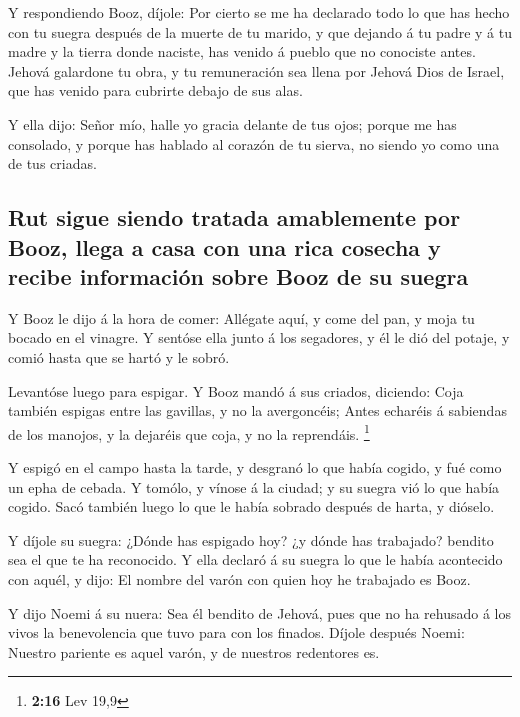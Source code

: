  Y respondiendo Booz, díjole: Por cierto se me ha declarado
todo lo que has hecho con tu suegra después de la muerte de tu marido, y
que dejando á tu padre y á tu madre y la tierra donde naciste, has
venido á pueblo que no conociste antes.  Jehová galardone
tu obra, y tu remuneración sea llena por Jehová Dios de Israel, que has
venido para cubrirte debajo de sus alas.

 Y ella dijo: Señor mío, halle yo gracia delante de tus
ojos; porque me has consolado, y porque has hablado al corazón de tu
sierva, no siendo yo como una de tus criadas.

\hypertarget{rut-sigue-siendo-tratada-amablemente-por-booz-llega-a-casa-con-una-rica-cosecha-y-recibe-informaciuxf3n-sobre-booz-de-su-suegra}{%
\subsection{Rut sigue siendo tratada amablemente por Booz, llega a casa
con una rica cosecha y recibe información sobre Booz de su
suegra}\label{rut-sigue-siendo-tratada-amablemente-por-booz-llega-a-casa-con-una-rica-cosecha-y-recibe-informaciuxf3n-sobre-booz-de-su-suegra}}

 Y Booz le dijo á la hora de comer: Allégate aquí, y come
del pan, y moja tu bocado en el vinagre. Y sentóse ella junto á los
segadores, y él le dió del potaje, y comió hasta que se hartó y le
sobró.

 Levantóse luego para espigar. Y Booz mandó á sus criados,
diciendo: Coja también espigas entre las gavillas, y no la avergoncéis;
 Antes echaréis á sabiendas de los manojos, y la dejaréis
que coja, y no la reprendáis. \footnote{\textbf{2:16} Lev 19,9}

 Y espigó en el campo hasta la tarde, y desgranó lo que
había cogido, y fué como un epha de cebada.  Y tomólo, y
vínose á la ciudad; y su suegra vió lo que había cogido. Sacó también
luego lo que le había sobrado después de harta, y dióselo.

 Y díjole su suegra: ¿Dónde has espigado hoy? ¿y dónde has
trabajado? bendito sea el que te ha reconocido. Y ella declaró á su
suegra lo que le había acontecido con aquél, y dijo: El nombre del varón
con quien hoy he trabajado es Booz.

 Y dijo Noemi á su nuera: Sea él bendito de Jehová, pues
que no ha rehusado á los vivos la benevolencia que tuvo para con los
finados. Díjole después Noemi: Nuestro pariente es aquel varón, y de
nuestros redentores es.

